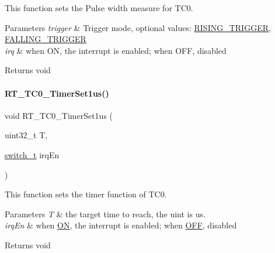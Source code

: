 This function sets the Pulse width measure for T\+C0. 


\begin{DoxyParams}{Parameters}
{\em trigger} & Trigger mode, optional values\+: \mbox{\hyperlink{a00020_a6d33f21be3f0c5cf91c5d638e8aca086a60a109ab1ab372f4e3935064a3f0a26c}{R\+I\+S\+I\+N\+G\+\_\+\+T\+R\+I\+G\+G\+ER}}, \mbox{\hyperlink{a00020_a6d33f21be3f0c5cf91c5d638e8aca086a75134708fc2093222ca5a56acefc5d3f}{F\+A\+L\+L\+I\+N\+G\+\_\+\+T\+R\+I\+G\+G\+ER}} \\
\hline
{\em irq} & when ON, the interrupt is enabled; when O\+FF, disabled \\
\hline
\end{DoxyParams}
\begin{DoxyReturn}{Returns}
void 
\end{DoxyReturn}
\mbox{\label{a00041_a8e0656cd8304f2e28517ca46b8f854a0}} 
\paragraph{\texorpdfstring{R\+T\+\_\+\+T\+C0\+\_\+\+Timer\+Set1us()}{RT\_TC0\_TimerSet1us()}}
{\footnotesize\ttfamily void R\+T\+\_\+\+T\+C0\+\_\+\+Timer\+Set1us (\begin{DoxyParamCaption}\item[{uint32\+\_\+t}]{T,  }\item[{\mbox{\hyperlink{a00020_ab43e533f3793920486fb81c580f71564}{switch\+\_\+t}}}]{irq\+En }\end{DoxyParamCaption})\hspace{0.3cm}{\ttfamily [inline]}}



This function sets the timer function of T\+C0. 


\begin{DoxyParams}{Parameters}
{\em T} & the target time to reach, the uint is us. \\
\hline
{\em irq\+En} & when \mbox{\hyperlink{a00020_ab43e533f3793920486fb81c580f71564a977d478dacaae531f95695750d1e9d03}{ON}}, the interrupt is enabled; when \mbox{\hyperlink{a00020_ab43e533f3793920486fb81c580f71564aac132f2982b98bcaa3445e535a03ff75}{O\+FF}}, disabled \\
\hline
\end{DoxyParams}
\begin{DoxyReturn}{Returns}
void 
\end{DoxyReturn}
